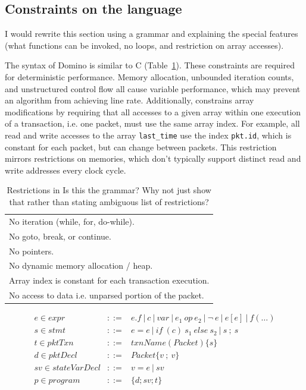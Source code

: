 \subsection{Constraints on the language}
\label{ss:constraints}

\ac{I would rewrite this section using a grammar and explaining the special
features (what functions can be invoked, no loops, 
and restriction on array accesses).}

The syntax of Domino is similar to C (Table~\ref{tab:restrict}).
These constraints are required for deterministic performance.  Memory
allocation, unbounded iteration counts, and unstructured control flow
all cause variable performance, which may prevent an algorithm from
achieving line rate.  Additionally, \pktlanguage constrains array
modifications by requiring that all accesses to a given array within
one execution of a transaction, i.e. one packet, must use the same
array index. For example, all read and write accesses to the array
\texttt{last\_time} use the index \texttt{pkt.id}, which is constant
for each packet, but can change between packets. This restriction
mirrors restrictions on memories, which don't typically support
distinct read and write addresses every clock cycle.

\begin{table}
  \begin{tabular}{p{}}
    No iteration (while, for, do-while).\\
    No goto, break, or continue.\\
    No pointers.\\
    No dynamic memory allocation / heap.\\
    Array index is constant for each transaction execution.\\
    No access to data i.e. unparsed portion of the packet.\\
  \end{tabular}

\newcommand{\sep}{~|~}
\begin{eqnarray*}
e \in expr &::=& e.f \sep c \sep var \sep e_1~op~e_2 \sep \neg~e \sep e[e] \sep f(\ldots) \\
%
s \in stmt &::=& e = e \sep if~(c)~s_1~else~s_2 \sep s~;~s \\
%
t \in pktTxn &::=& txnName(Packet) \{ s \} \\
%
d \in pktDecl &::=& Packet \{ v~;~v \} \\
%
sv \in stateVarDecl &::=& v = e \sep sv \\
%
p \in program &::=& \{ d ; sv ; t \}
\end{eqnarray*}

  \caption{Restrictions in \pktlanguage \ac{Is this the grammar? Why not just show 
  that rather than stating ambiguous list of restrictions?}}
  \label{tab:restrict}
\end{table}

